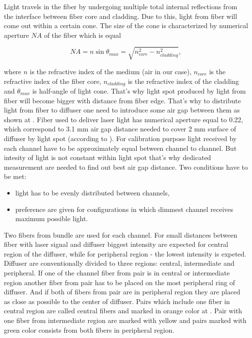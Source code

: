 Light travels in the fiber by undergoing multiple total internal reflections from the interface between fiber core and cladding. 
Due to this, light from fiber will come out within a certain cone. The size of the cone is characterized by numerical aperture $NA$ of the fiber which is equal

\begin{equation}
\label{eq:numericalApperture}
 NA = n \sin{\theta_{max}} = \sqrt{n_{core}^2 - n_{cladding}^2},
\end{equation}

where $n$ is the refractive index of the medium (air in our case), $n_{core}$ is the refractive index of the fiber core, $n_{cladding}$ is the refractive index 
of the cladding and $\theta_{max}$ is half-angle of light cone. That's why light spot produced by light from fiber will become bigger with distance from fiber 
edge. 
That's why to distribute light from fiber to diffuser one need to introduce some air gap between them as shown at .
Fiber used to deliver laser light has numerical aperture equal to 0.22, which correspond to 3.1 mm air gap distance needed to cover 2 mm surface of diffuser by 
light spot (according to ).
For calibration purpose light received by each channel have to be approximately equal between channel to channel. But intesity of light is not constant within 
light spot that's why dedicated measurement are needed to find out best air gap distance.
Two conditions have to be met:
\begin{itemize}
 \item light has to be evenly distributed between channels,
 \item preference are given for configurations in which dimmest channel receives maximum possible light.
\end{itemize}
Two fibers from bundle are used for each channel. For small distances between fiber with laser signal and diffuser biggest intensity are expected for central 
region of the diffuser, while for peripheral region - the lowest intensity is expeted. 
Diffuser are conventionally divided to three regions: central, intermediate and peripheral. 
If one of the channel fiber from pair is in central or intermediate region another fiber from pair has to be placed on the most peripheral ring of diffuser.
And if both of fibers from pair are in peripheral region they are placed as close as possible to the center of diffuser.
Pairs which include one fiber in central region are called central fibers and marked in orange color at .
Pair with one fiber from intermediate region are marked with yellow and pairs marked with green color consists from both fibers in peripheral region.






